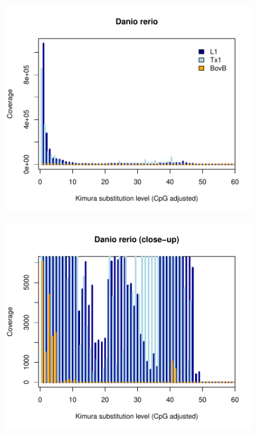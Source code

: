 \documentclass[12pt,a4paper,times]{article}
\begin{document}
\begin{figure}[H]
	\centering
	\includegraphics[scale=0.8]{suppFigures/divergencePlots/Danio_rerio.pdf}
	\caption{\label{Danio_rerio}}
\end{figure}

\begin{figure}[H]
	\centering
	\includegraphics[scale=0.8]{suppFigures/divergencePlots/Danio_rerio_closeup.pdf}
	\caption{\label{Danio_rerio_closeup}}
\end{figure}
\end{document}
